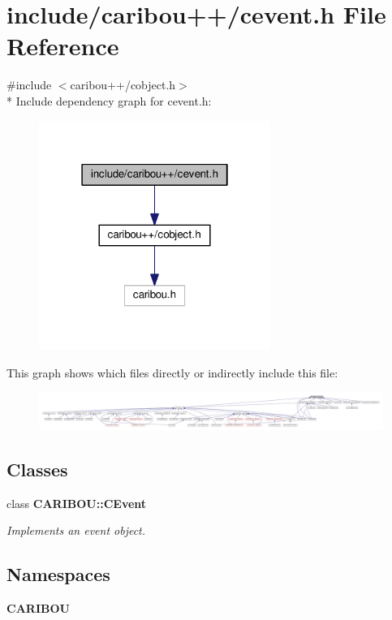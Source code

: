 \section{include/caribou++/cevent.h File Reference}
\label{cevent_8h}
{\ttfamily \#include $<$caribou++/cobject.\+h$>$}\\*
Include dependency graph for cevent.\+h\+:
\nopagebreak
\begin{figure}[H]
\begin{center}
\leavevmode
\includegraphics[width=214pt]{cevent_8h__incl}
\end{center}
\end{figure}
This graph shows which files directly or indirectly include this file\+:
\nopagebreak
\begin{figure}[H]
\begin{center}
\leavevmode
\includegraphics[width=350pt]{cevent_8h__dep__incl}
\end{center}
\end{figure}
\subsection*{Classes}
\begin{DoxyCompactItemize}
\item 
class {\bf C\+A\+R\+I\+B\+O\+U\+::\+C\+Event}
\begin{DoxyCompactList}\small\item\em Implements an event object. \end{DoxyCompactList}\end{DoxyCompactItemize}
\subsection*{Namespaces}
\begin{DoxyCompactItemize}
\item 
 {\bf C\+A\+R\+I\+B\+OU}
\end{DoxyCompactItemize}
